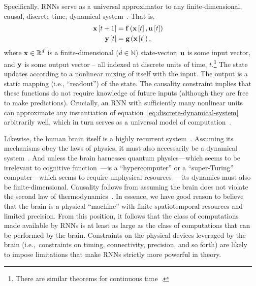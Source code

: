 Specifically, RNNs serve as a universal approximator to any finite-dimensional, causal, discrete-time, dynamical system~\citep{schafer2006recurrent}.
That is,
\begin{equation}
\begin{aligned} \label{eq:discrete-dynamical-system}
\mathbf{x}\left[ t + 1 \right] &= \mathbf{f}\left(\mathbf{x}\left[ t \right], \mathbf{u}\left[ t \right] \right) \\
\mathbf{y}\left[ t \right] &= \mathbf{g}\left(\mathbf{x}\left[ t \right] \right) \text{,}
\end{aligned}
\end{equation}
where $\mathbf{x} \in \mathbb{R}^d$ is a finite-dimensional ($d \in \mathbb{N}$) state-vector, $\mathbf{u}$ is some input vector, and $\mathbf{y}$ is some output vector -- all indexed at discrete units of time, $t$.\footnote{
There are similar theorems for continuous time~\citep{funahashi1993approximation, bennett1995universal}.
}
The state updates according to a nonlinear mixing of itself with the input.
The output is a static mapping (i.e., ``readout'') of the state.
The causality constraint implies that these functions do not require knowledge of future inputs (although they are free to make predictions).
Crucially, an RNN with sufficiently many nonlinear units can approximate any instantiation of equation~\ref{eq:discrete-dynamical-system} arbitrarily well, which in turn serves as a universal model of computation~\citep{turing1938computable}.

Likewise, the human brain itself is a highly recurrent system~\citep{dayan2001theoretical}.
Assuming its mechanisms obey the laws of physics, it must also necessarily be a dynamical system~\citep{amit1989modeling, mckenna1994brain, port1995mind}.
And unless the brain harnesses quantum physics---which seems to be irrelevant to cognitive function~\citep{litt2006brain}---is a ``hypercomputer'' or a ``super-Turing'' computer---which seems to require unphysical resources~\citep{broersma2018computability}---its dynamics must also be finite-dimensional.
Causality follows from assuming the brain does not violate the second law of thermodynamics~\citep{evans1996causality}.
In essence, we have good reason to believe that the brain is a physical ``machine'' with finite spatiotemporal resources and limited precision.
From this position, it follows that the class of computations made available by RNNs is at least as large as the class of computations that can be performed by the brain.
Constraints on the physical devices leveraged by the brain (i.e.,~constraints on timing, connectivity, precision, and so forth) are likely to impose limitations that make RNNs strictly more powerful in theory.

